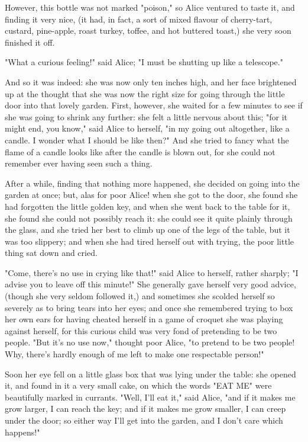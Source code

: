 \documentclass[aps,prb,amsmath,twocolumn,amssymb,titlepage]{revtex4-2}
\begin{document}
However, this bottle was not marked "poison," so Alice ventured to taste it, and finding it very nice, (it had, in fact, a sort of mixed flavour of cherry-tart, custard, pine-apple, roast turkey, toffee, and hot buttered toast,) she very soon finished it off.

"What a curious feeling!" said Alice; "I must be shutting up like a telescope."

And so it was indeed: she was now only ten inches high, and her face brightened up at the thought that she was now the right size for going through the little door into that lovely garden. First, however, she waited for a few minutes to see if she was going to shrink any further: she felt a little nervous about this; "for it might end, you know," said Alice to herself, "in my going out altogether, like a candle. I wonder what I should be like then?" And she tried to fancy what the flame of a candle looks like after the candle is blown out, for she could not remember ever having seen such a thing.

After a while, finding that nothing more happened, she decided on going into the garden at once; but, alas for poor Alice! when she got to the door, she found she had forgotten the little golden key, and when she went back to the table for it, she found she could not possibly reach it: she could see it quite plainly through the glass, and she tried her best to climb up one of the legs of the table, but it was too slippery; and when she had tired herself out with trying, the poor little thing sat down and cried.

"Come, there's no use in crying like that!" said Alice to herself, rather sharply; "I advise you to leave off this minute!" She generally gave herself very good advice, (though she very seldom followed it,) and sometimes she scolded herself so severely as to bring tears into her eyes; and once she remembered trying to box her own ears for having cheated herself in a game of croquet she was playing against herself, for this curious child was very fond of pretending to be two people. "But it's no use now," thought poor Alice, "to pretend to be two people! Why, there's hardly enough of me left to make one respectable person!"

Soon her eye fell on a little glass box that was lying under the table: she opened it, and found in it a very small cake, on which the words "EAT ME" were beautifully marked in currants. "Well, I'll eat it," said Alice, "and if it makes me grow larger, I can reach the key; and if it makes me grow smaller, I can creep under the door; so either way I'll get into the garden, and I don't care which happens!"
\end{document}
